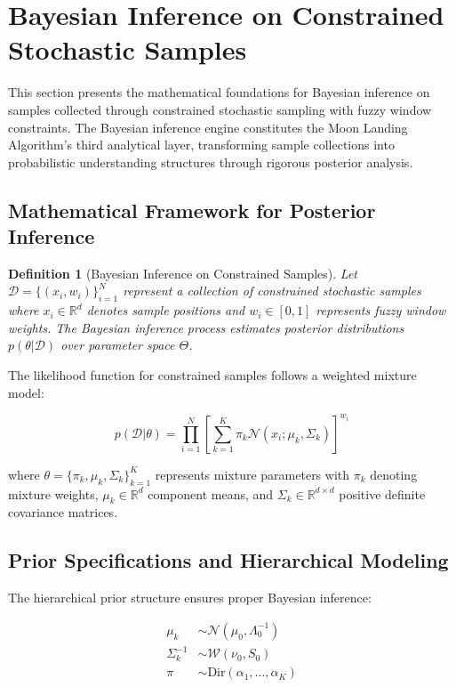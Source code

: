 \documentclass[11pt,a4paper]{article}
\newtheorem{definition}[theorem]{Definition}
\begin{document}
\section{Bayesian Inference on Constrained Stochastic Samples}
\label{sec:bayesian-inference}

This section presents the mathematical foundations for Bayesian inference on samples collected through constrained stochastic sampling with fuzzy window constraints. The Bayesian inference engine constitutes the Moon Landing Algorithm's third analytical layer, transforming sample collections into probabilistic understanding structures through rigorous posterior analysis.

\subsection{Mathematical Framework for Posterior Inference}

\begin{definition}[Bayesian Inference on Constrained Samples]
Let $\mathcal{D} = \{(x_i, w_i)\}_{i=1}^N$ represent a collection of constrained stochastic samples where $x_i \in \mathbb{R}^d$ denotes sample positions and $w_i \in [0,1]$ represents fuzzy window weights. The Bayesian inference process estimates posterior distributions $p(\theta|\mathcal{D})$ over parameter space $\Theta$.
\end{definition}

The likelihood function for constrained samples follows a weighted mixture model:

\begin{equation}
p(\mathcal{D}|\theta) = \prod_{i=1}^N \left[ \sum_{k=1}^K \pi_k \mathcal{N}(x_i; \mu_k, \Sigma_k) \right]^{w_i}
\label{eq:constrained-likelihood}
\end{equation}

where $\theta = \{\pi_k, \mu_k, \Sigma_k\}_{k=1}^K$ represents mixture parameters with $\pi_k$ denoting mixture weights, $\mu_k \in \mathbb{R}^d$ component means, and $\Sigma_k \in \mathbb{R}^{d \times d}$ positive definite covariance matrices.

\subsection{Prior Specifications and Hierarchical Modeling}

The hierarchical prior structure ensures proper Bayesian inference:

\begin{align}
\mu_k &\sim \mathcal{N}(\mu_0, \Lambda_0^{-1}) \label{eq:mean-prior}\\
\Sigma_k^{-1} &\sim \mathcal{W}(\nu_0, S_0) \label{eq:precision-prior}\\
\pi &\sim \text{Dir}(\alpha_1, \ldots, \alpha_K) \label{eq:mixture-prior}
\end{align}
\end{document}
